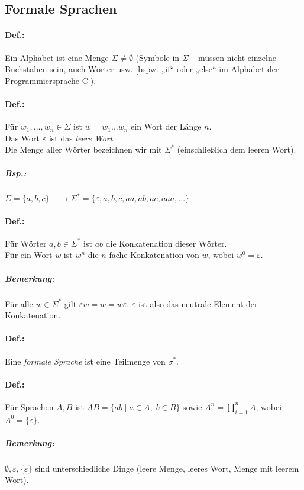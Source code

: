 \subsection{Formale Sprachen}
\paragraph{Def.:} Ein Alphabet ist eine Menge $\Sigma \not = \emptyset$ (Symbole in $\Sigma$ -- müssen nicht einzelne Buchstaben sein, auch Wörter usw. [bspw. „if“ oder „else“ im Alphabet der Programmiersprache C]).

\paragraph{Def.:} Für $w_1, ..., w_n \in \Sigma$ ist $w=w_1...w_n$ ein Wort der Länge $n$.\\
Das Wort $\varepsilon$ ist das \emph{leere Wort}.\\
Die Menge aller Wörter bezeichnen wir mit $\Sigma^*$ (einschließlich dem leeren Wort).

\subparagraph{Bsp.:} $\Sigma = \{a,b,c\}\quad \rightarrow \Sigma^*=\{\varepsilon, a, b, c, aa, ab,a c, aaa, ...\}$
\paragraph{Def.:} Für Wörter $a,b \in \Sigma^*$ ist $ab$ die Konkatenation dieser Wörter.\\
Für ein Wort $w$ ist $w^n$ die $n$-fache Konkatenation von $w$, wobei $w^0=\varepsilon$.

\subparagraph{Bemerkung:} Für alle $w \in \Sigma^*$ gilt $\varepsilon w = w = w \varepsilon$. $\varepsilon$ ist also das neutrale Element der Konkatenation.

\paragraph{Def.:} Eine \emph{formale Sprache} ist eine Teilmenge von $\sigma^*$.

\paragraph{Def.:} Für Sprachen $A, B$ ist $AB=\{ab \;|\; a \in A, \; b \in B\}$ sowie $A^n=\prod_{i=1}^{n}A$, wobei $A^0=\{\varepsilon\}$.
\subparagraph{Bemerkung:} $\emptyset, \varepsilon, \{\varepsilon\}$ sind unterschiedliche Dinge (leere Menge, leeres Wort, Menge mit leerem Wort).

